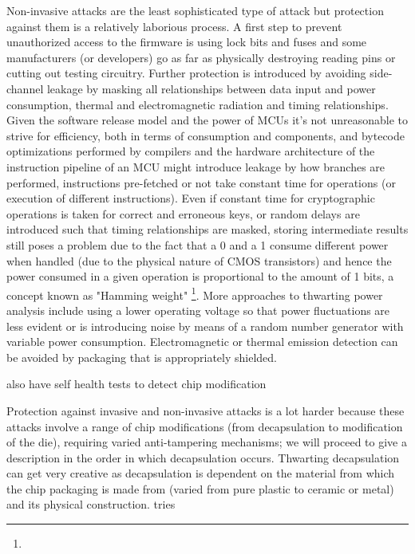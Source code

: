 Non-invasive attacks are the least sophisticated type of attack but protection against them is a relatively laborious process\citep{anderson:cautionary_note}. A first step to prevent unauthorized access to the firmware is using lock bits and fuses\citep{atmega_manual}\citep{tech:avrfreaks} and some manufacturers (or developers) go as far as physically destroying reading pins or cutting out testing circuitry\citep{sergei:thesis}. Further protection is introduced by avoiding side-channel leakage by masking all relationships between data input and power consumption, thermal and electromagnetic radiation and timing relationships\citep{kocher:DPA}\cite{sergei:thesis}. Given the software release model and the power of MCUs it's not unreasonable to strive for efficiency, both in terms of consumption and components, and bytecode optimizations performed by compilers and the hardware architecture of the instruction pipeline of an MCU might introduce leakage \citep{kocher:DPA}\citep{sergei:thesis} by how branches are performed, instructions pre-fetched or not take constant time for operations (or execution of different instructions). Even if constant time for cryptographic operations is taken for correct and erroneous keys, or random delays are introduced such that timing relationships are masked, storing intermediate results still poses a problem due to the fact that a 0 and a 1 consume different power when handled (due to the physical nature of CMOS transistors) and hence the power consumed in a given operation is proportional to the amount of 1 bits, a concept known as "Hamming weight" \citep{website:riscure}\citep{kocher:DPA}\footnote{}. More approaches to thwarting power analysis include using a lower operating voltage so that power fluctuations are less evident or is introducing noise by means of a random number generator with variable power consumption\citep{kocher:DPA}\citep{hwre}\citep{kocher:DPA}. Electromagnetic or thermal emission detection can be avoided by packaging that is appropriately shielded\citep{website:ibm_secure}\citep{kocher:DPA}. 


also have self health tests to detect chip modification \citep{anderson:tamper_resistance}

Protection against invasive and non-invasive attacks is a lot harder because these attacks involve a range of chip modifications (from decapsulation to modification of the die), requiring varied anti-tampering mechanisms; we will proceed to give a description in the order in which decapsulation occurs. Thwarting decapsulation can get very creative as decapsulation is dependent on the material from which the chip packaging is made from (varied from pure plastic to ceramic or metal) and its physical construction. tries 

